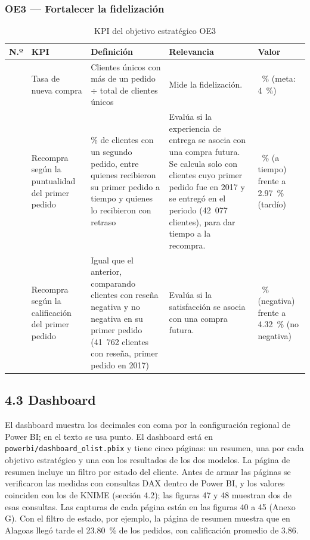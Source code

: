 \documentclass[a4paper,stu,12pt,donotrepeattitle,floatsintext]{apa7}
\begin{document}
\subsubsection{OE3 — Fortalecer la fidelización}
{\footnotesize
\begin{longtable}{|>{\raggedright\arraybackslash}p{}|>{\raggedright\arraybackslash}p{}|>{\raggedright\arraybackslash}p{}|>{\raggedright\arraybackslash}p{}|>{\raggedright\arraybackslash}p{}|}
\caption{KPI del objetivo estratégico OE3}\\
\hline
\textbf{N.º} & \textbf{KPI} & \textbf{Definición} & \textbf{Relevancia} & \textbf{Valor} \\ \hline
\endhead
9 & Tasa de nueva compra & Clientes únicos con más de un pedido $\div$ total de clientes únicos & Mide la fidelización. & 3.12~\% (meta: 4~\%) \\ \hline
10 & Recompra según la puntualidad del primer pedido & \% de clientes con un segundo pedido, entre quienes recibieron su primer pedido a tiempo y quienes lo recibieron con retraso & Evalúa si la experiencia de entrega se asocia con una compra futura. Se calcula solo con clientes cuyo primer pedido fue en 2017 y se entregó en el periodo (42~077 clientes), para dar tiempo a la recompra. & 4.34~\% (a tiempo) frente a 2.97~\% (tardío) \\ \hline
11 & Recompra según la calificación del primer pedido & Igual que el anterior, comparando clientes con reseña negativa y no negativa en su primer pedido (41~762 clientes con reseña, primer pedido en 2017) & Evalúa si la satisfacción se asocia con una compra futura. & 3.73~\% (negativa) frente a 4.32~\% (no negativa) \\ \hline
\end{longtable}
}
\subsection{4.3 Dashboard}
El dashboard muestra los decimales con coma por la configuración regional de Power BI; en el texto se usa punto. El dashboard está en \texttt{powerbi/\allowbreak{}dashboard\_\allowbreak{}olist.pbix} y tiene cinco páginas: un resumen, una por cada objetivo estratégico y una con los resultados de los dos modelos. La página de resumen incluye un filtro por estado del cliente. Antes de armar las páginas se verificaron las medidas con consultas DAX dentro de Power BI, y los valores coinciden con los de KNIME (sección 4.2); las figuras 47 y 48 muestran dos de esas consultas. Las capturas de cada página están en las figuras 40 a 45 (Anexo G). Con el filtro de estado, por ejemplo, la página de resumen muestra que en Alagoas llegó tarde el 23.80~\% de los pedidos, con calificación promedio de 3.86.
\end{document}
